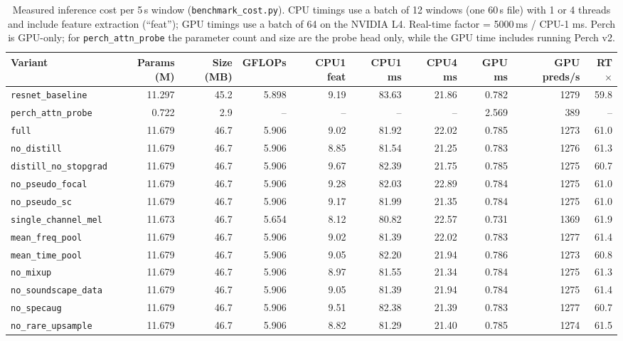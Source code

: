 \begin{table}[H]\centering\small
\caption{Measured inference cost per 5\,s window (\texttt{benchmark\_cost.py}). CPU timings use a batch of 12 windows (one 60\,s file) with 1 or 4 threads and include feature extraction (``feat''); GPU timings use a batch of 64 on the NVIDIA L4. Real-time factor = 5000\,ms / CPU-1 ms. Perch is GPU-only; for \texttt{perch\_attn\_probe} the parameter count and size are the probe head only, while the GPU time includes running Perch v2.}
\label{tab:cost}
\setlength{\tabcolsep}{3pt}
\begin{adjustbox}{max width=\linewidth}
\begin{tabular}{lrrrrrrrrr}
\toprule
Variant & Params (M) & Size (MB) & GFLOPs & CPU1 feat & CPU1 ms & CPU4 ms & GPU ms & GPU preds/s & RT$\times$ \\
\midrule
\texttt{resnet\_baseline} & 11.297 & 45.2 & 5.898 & 9.19 & 83.63 & 21.86 & 0.782 & 1279 & 59.8 \\
\texttt{perch\_attn\_probe} & 0.722 & 2.9 & -- & -- & -- & -- & 2.569 & 389 & -- \\
\texttt{full} & 11.679 & 46.7 & 5.906 & 9.02 & 81.92 & 22.02 & 0.785 & 1273 & 61.0 \\
\texttt{no\_distill} & 11.679 & 46.7 & 5.906 & 8.85 & 81.54 & 21.25 & 0.783 & 1276 & 61.3 \\
\texttt{distill\_no\_stopgrad} & 11.679 & 46.7 & 5.906 & 9.67 & 82.39 & 21.75 & 0.785 & 1275 & 60.7 \\
\texttt{no\_pseudo\_focal} & 11.679 & 46.7 & 5.906 & 9.28 & 82.03 & 22.89 & 0.784 & 1275 & 61.0 \\
\texttt{no\_pseudo\_sc} & 11.679 & 46.7 & 5.906 & 9.17 & 81.99 & 21.35 & 0.784 & 1275 & 61.0 \\
\texttt{single\_channel\_mel} & 11.673 & 46.7 & 5.654 & 8.12 & 80.82 & 22.57 & 0.731 & 1369 & 61.9 \\
\texttt{mean\_freq\_pool} & 11.679 & 46.7 & 5.906 & 9.02 & 81.39 & 22.02 & 0.783 & 1277 & 61.4 \\
\texttt{mean\_time\_pool} & 11.679 & 46.7 & 5.906 & 9.05 & 82.20 & 21.94 & 0.786 & 1273 & 60.8 \\
\texttt{no\_mixup} & 11.679 & 46.7 & 5.906 & 8.97 & 81.55 & 21.34 & 0.784 & 1275 & 61.3 \\
\texttt{no\_soundscape\_data} & 11.679 & 46.7 & 5.906 & 9.05 & 81.39 & 21.94 & 0.784 & 1275 & 61.4 \\
\texttt{no\_specaug} & 11.679 & 46.7 & 5.906 & 9.51 & 82.38 & 21.39 & 0.783 & 1277 & 60.7 \\
\texttt{no\_rare\_upsample} & 11.679 & 46.7 & 5.906 & 8.82 & 81.29 & 21.40 & 0.785 & 1274 & 61.5 \\
\bottomrule
\end{tabular}
\end{adjustbox}
\end{table}
